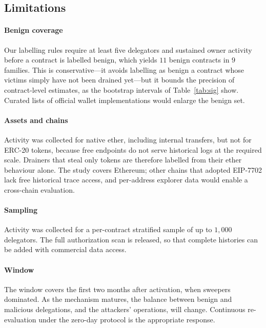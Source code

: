 \subsection{Limitations}
\paragraph{Benign coverage} Our labelling rules require at least five delegators and sustained owner activity before a contract is labelled benign, which yields $11$ benign contracts in $9$ families. This is conservative---it avoids labelling as benign a contract whose victims simply have not been drained yet---but it bounds the precision of contract-level estimates, as the bootstrap intervals of Table~\ref{tab:sig} show. Curated lists of official wallet implementations would enlarge the benign set.
\paragraph{Assets and chains} Activity was collected for native ether, including internal transfers, but not for ERC-20 tokens, because free endpoints do not serve historical logs at the required scale. Drainers that steal only tokens are therefore labelled from their ether behaviour alone. The study covers Ethereum; other chains that adopted EIP-7702 lack free historical trace access, and per-address explorer data would enable a cross-chain evaluation.
\paragraph{Sampling} Activity was collected for a per-contract stratified sample of up to $1{,}000$ delegators. The full authorization scan is released, so that complete histories can be added with commercial data access.
\paragraph{Window} The window covers the first two months after activation, when sweepers dominated. As the mechanism matures, the balance between benign and malicious delegations, and the attackers' operations, will change. Continuous re-evaluation under the zero-day protocol is the appropriate response.

